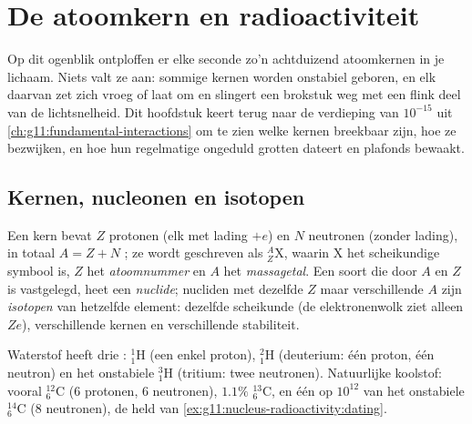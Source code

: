 \chapter{De atoomkern en radioactiviteit}\label{ch:g11:nucleus-radioactivity}

Op dit ogenblik ontploffen er elke seconde zo'n achtduizend atoomkernen in
je lichaam. Niets valt ze aan: sommige kernen worden onstabiel geboren, en
elk daarvan zet zich vroeg of laat om en slingert een brokstuk weg met een
flink deel van de lichtsnelheid. Dit hoofdstuk keert terug naar de
verdieping van $10^{-15}$  uit
\cref{ch:g11:fundamental-interactions} om te zien welke kernen breekbaar
zijn, hoe ze bezwijken, en hoe hun regelmatige ongeduld grotten dateert en
plafonds bewaakt.

\section{Kernen, nucleonen en isotopen}

\begin{definition}[Kernnotatie]\label{def:g11:nucleus-radioactivity:notation}
Een kern bevat $Z$ protonen (elk met lading $+e$) en $N$ neutronen (zonder
lading), in totaal $A = Z + N$ ; ze wordt geschreven als
${}^{A}_{Z}\mathrm{X}$, waarin $\mathrm X$ het scheikundige symbool is,
$Z$ het \emph{atoomnummer} en $A$ het
\emph{massagetal}. Een soort die door $A$ en $Z$ is
vastgelegd, heet een \emph{nuclide}; nucliden met dezelfde
$Z$ maar verschillende $A$ zijn \emph{isotopen} van
hetzelfde element: dezelfde scheikunde (de elektronenwolk ziet alleen
$Ze$), verschillende kernen en verschillende stabiliteit.
\end{definition}

\begin{example}\label{ex:g11:nucleus-radioactivity:hc}
Waterstof heeft drie : ${}^{1}_{1}\mathrm{H}$ (een enkel proton),
${}^{2}_{1}\mathrm{H}$ (deuterium: één proton, één neutron) en het
onstabiele ${}^{3}_{1}\mathrm{H}$ (tritium: twee neutronen). Natuurlijke
koolstof: vooral ${}^{12}_{6}\mathrm{C}$ ($6$ protonen, $6$ neutronen),
$1.1\%$ ${}^{13}_{6}\mathrm{C}$, en één  op $10^{12}$ van het
onstabiele ${}^{14}_{6}\mathrm{C}$ ($8$ neutronen), de held van
\cref{ex:g11:nucleus-radioactivity:dating}.
\end{example}

